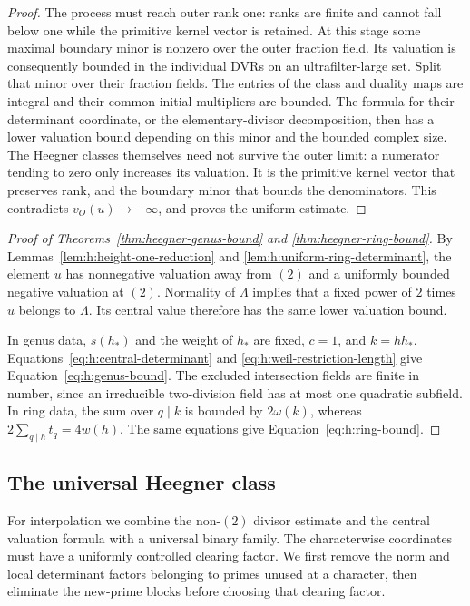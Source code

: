 \begin{proof}
The process must reach outer rank one: ranks are finite and cannot
fall below one while the primitive kernel vector is retained. At this
stage some maximal boundary minor is nonzero over the outer fraction
field. Its valuation is consequently bounded in the individual DVRs
on an ultrafilter-large set. Split that minor over their fraction
fields. The entries of the class and duality maps are integral and
their common initial multipliers are bounded. The formula for their
determinant coordinate, or the elementary-divisor decomposition, then
has a lower valuation bound depending on this minor and the bounded
complex size. The Heegner classes themselves need not survive the outer
limit: a numerator tending to zero only increases its valuation. It is
the primitive kernel vector that preserves rank, and the boundary minor
that bounds the denominators. This contradicts $v_O(u)\to-\infty$, and
proves the uniform estimate.
\end{proof}

\begin{proof}[Proof of Theorems~\ref{thm:heegner-genus-bound} and
\ref{thm:heegner-ring-bound}]
By Lemmas~\ref{lem:h:height-one-reduction} and
\ref{lem:h:uniform-ring-determinant}, the element $u$ has nonnegative
valuation away from $(2)$ and a uniformly bounded negative valuation
at $(2)$. Normality of $\Lambda$ implies that a fixed power of $2$
times $u$ belongs to $\Lambda$. Its central value therefore has the
same lower valuation bound.

In genus data, $s(h_*)$ and the weight of $h_*$ are fixed, $c=1$,
and $k=hh_*$. Equations~\eqref{eq:h:central-determinant} and
\eqref{eq:h:weil-restriction-length} give
Equation~\eqref{eq:h:genus-bound}. The excluded intersection fields
are finite in number, since an irreducible two-division field has
at most one quadratic subfield. In ring data, the sum over $q\mid k$
is bounded by $2\omega(k)$, whereas
$2\sum_{q\mid h}t_q=4w(h)$. The same equations give
Equation~\eqref{eq:h:ring-bound}.
\end{proof}

\subsection{The universal Heegner class}
\label{sec:h:universal-class}

For interpolation we combine the non-$(2)$ divisor estimate and the
central valuation formula with a universal binary family. The
characterwise coordinates must have a uniformly controlled clearing
factor. We first remove the
norm and local determinant factors belonging to primes unused at a
character, then eliminate the new-prime blocks before choosing that
clearing factor.


